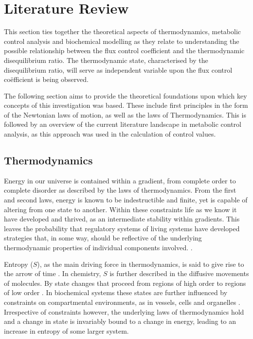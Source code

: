\chapter{Literature Review} \label{chp:2}
This section ties together the theoretical aspects of thermodynamics, metabolic control analysis and biochemical modelling as they relate to understanding the possible relationship between the flux control coefficient and the thermodynamic disequilibrium ratio. The thermodynamic state, characterised by the disequilibrium ratio, will serve as independent variable  upon the flux control co\"efficient is being observed.

The following section aims to provide the theoretical foundations upon which key concepts of this investigation was based. These include first principles in the form of the Newtonian laws of motion, as well as the laws of Thermodynamics. This is followed by an overview of the current literature landscape in metabolic control analysis, as this approach was used in the calculation of control values.


\section{Thermodynamics}
Energy in our universe is contained within a gradient, from complete order to complete disorder as described by the laws of thermodynamics. From the first and second laws, energy is known to be indestructible and finite, yet is capable of altering from one state to another. Within these constraints life as we know it have developed and thrived, as an intermediate stability within gradients. This leaves the probability that regulatory systems of living systems have developed strategies that, in some way, should be reflective of the underlying thermodynamic properties of individual components involved.
\cite{Schneider1994, Prigogine1998}. 

Entropy ($S$), as the main driving force in thermodynamics, is said to give rise to the arrow of time  \cite{Lebowitz1994}. In chemistry, $S$ is further described in the diffusive movements of molecules. By state changes that proceed from regions of high order to regions of low order \cite{Roos2014}. In biochemical systems these states are further influenced by constraints on compartmental environments, as in vessels, cells and organelles \cite{Kramers1940, Burada2009}. Irrespective of constraints however, the underlying laws of thermodynamics hold and a change in state is invariably bound to a change in energy, leading to an increase in entropy of some larger system. 


